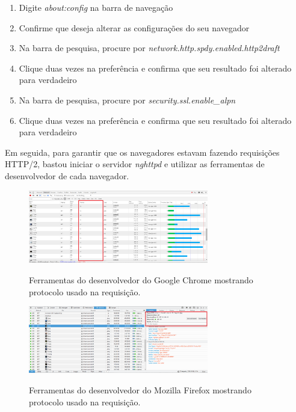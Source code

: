 \begin{enumerate}
	\item Digite \textit{about:config} na barra de navegação
	\item Confirme que deseja alterar as configurações do seu navegador
	\item Na barra de pesquisa, procure por \textit{network.http.spdy.enabled.http2draft}
	\item Clique duas vezes na preferência e confirma que seu resultado foi alterado para verdadeiro
	\item Na barra de pesquisa, procure por \textit{security.ssl.enable\_alpn}
	\item Clique duas vezes na preferência e confirma que seu resultado foi alterado para verdadeiro	
\end{enumerate}

Em seguida, para garantir que os navegadores estavam fazendo requisições HTTP/2, bastou iniciar o servidor \textit{nghttpd} e utilizar as ferramentas de desenvolvedor de cada navegador.

\begin{figure}[!htb]
    \centering
    \caption{Ferramentas do desenvolvedor do Google Chrome mostrando protocolo usado na requisição.}
    \includegraphics[width=0.7\textwidth]{./04-figuras/desenvolvimento/http2_chrome}
    \label{fig:httpcontenttype2011}
\end{figure}

\begin{figure}[!htb]
    \centering
    \caption{Ferramentas do desenvolvedor do Mozilla Firefox mostrando protocolo usado na requisição.}
    \includegraphics[width=0.7\textwidth]{./04-figuras/desenvolvimento/http2_firefox}
    \label{fig:httpcontenttype2011}
\end{figure}

